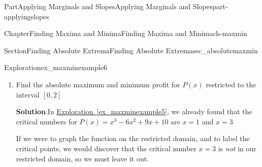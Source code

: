 \documentclass{tufte-book}
\newcommand{\blocktitlefont}{\relax}
\newcommand{\xreffont}{\relax}
\numberwithin{equation}{chapter}
\newcommand{\amp}{&}
\begin{document}
\begin{partptx}{Part}{Applying Marginals and Slopes}{}{Applying Marginals and Slopes}{}{}{part-applyingslopes}
\begin{chapterptx}{Chapter}{Finding Maxima and Minima}{}{Finding Maxima and Minima}{}{}{ch-maxmin}
\begin{sectionptx}{Section}{Finding Absolute Extrema}{}{Finding Absolute Extrema}{}{}{sec_absolutemaxmin}
\begin{exploration}{Exploration}{}{ex_maxminexample6}
\begin{enumerate}[font=\bfseries,label=(\alph*),ref=\alph*]
\begin{image}{0.25}{0.5}{0.25}{}
{
}%
\end{image}%
%
\par
From our picture, it looks like the point at \(x=5\) will give us the largest profit, and the points at \(x=0\) and \(x=3\) will give us the same smallest profit%
\par
To confirm this, we evaluate the \emph{original}, total profit function \(P(x)\) at these four points:%
%
\begin{align*}
\color{red}  P(1) \amp = (1)^3 - 6(1)^2 + 9(1) + 10 = 14\\
\color{red}  P(3) \amp = (3)^3 - 6(3)^2 + 9(3) + 10 = 10\\
\color{blue} P(0) \amp = (0)^3 - 6(0)^2 + 9(0) + 10 = 10\\
\color{blue} P(5) \amp = (5)^3 - 6(5)^2 + 9(5) + 10 = 30
\end{align*}
This confirms that on this interval, an absolute maximum proift of \textdollar{}30 occurs when \(x=5\), and that an absolute mininmum profit of \textdollar{}10 occurs when either \(x=0\) or \(x=3\).%
\item{}Find the absolute maximum and minimum profit for  \(P(x)\) restricted to the interval \([0,2]\)%
\par\smallskip%
\noindent\textbf{\blocktitlefont Solution}.\hypertarget{ex_maxminexample6-3-2}{}\quad{}In \hyperref[ex_maxminexample5]{Exploration~{\xreffont\ref{ex_maxminexample5}}}, we already found that the critical numbers for \(P(x)  = x^3 - 6x^2  + 9x + 10\) are \(x=1\) and \(x=3\)%
\par
If we were to graph the function on the restricted domain, and to label the critical points, we would discover that the critical number \(x=3\) is \emph{not} in our restricted domain, so we must leave it out. \begin{image}{0.25}{0.5}{0.25}{}%
\end{image}
\end{enumerate}
\end{exploration}
\end{sectionptx}
\end{chapterptx}
\end{partptx}
\end{document}

